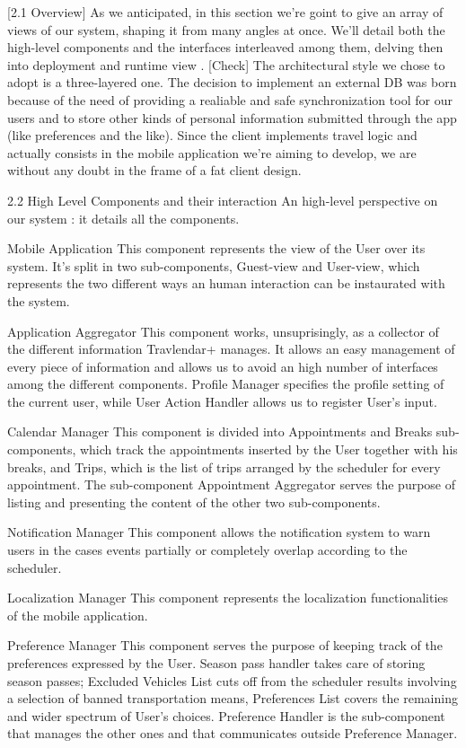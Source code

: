 [2.1 Overview]
As we anticipated, in this section we’re goint to give an array of views of our system, shaping it from many angles at once. We’ll detail both the high-level components and the interfaces interleaved among them, delving then into deployment and runtime view .
[Check] The architectural style we chose to adopt is a three-layered one.
The decision to implement an external DB was born because of the need of providing a realiable and safe synchronization tool for our users and to store other kinds of personal information submitted through the app (like preferences and the like).
Since the client implements travel logic and actually consists in the mobile application we’re aiming to develop, we are without any doubt in the frame of a fat client design.


2.2 High Level Components and their interaction
An high-level perspective on our system : it details all the components.


Mobile Application
This component represents the view of the User over its system. It’s split in two sub-components, Guest-view and User-view, which represents the two different ways an human interaction can be instaurated with the system.

Application Aggregator
This component works, unsuprisingly, as a collector of the different information Travlendar+ manages. It allows an easy management of every piece of information and allows us to avoid an high number of interfaces among the different components. Profile Manager specifies the profile setting of the current user, while User Action Handler allows us to register User's input.
 
Calendar Manager
This component is divided into Appointments and Breaks sub-components, which track the appointments inserted by the User together with his breaks, and Trips, which is the list of trips arranged by the scheduler for every appointment. The sub-component Appointment Aggregator serves the purpose of listing and presenting the content of the other two sub-components.

Notification Manager
This component allows the notification system to warn users in the cases events partially or completely overlap according to the scheduler.

Localization Manager
This component represents the localization functionalities of the mobile application.  

Preference Manager
This component serves the purpose of keeping track of the preferences expressed by the User. Season pass handler takes care of storing season passes; Excluded Vehicles List cuts off from the scheduler results involving a selection of banned transportation means, Preferences List covers the remaining and wider spectrum of User's choices.
Preference Handler is the sub-component that manages the other ones and that communicates outside Preference Manager.

